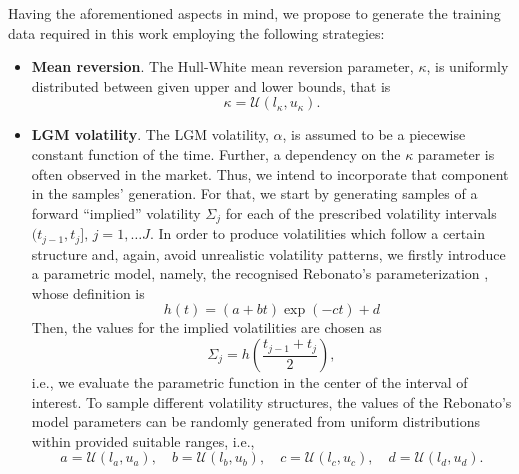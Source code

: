         Having the aforementioned aspects in mind, we propose to generate the training data required in this work employing the following strategies:
        \begin{itemize}
        
            \item \textbf{Mean reversion}. The Hull-White mean reversion parameter, $\kappa$, is uniformly distributed between given upper and lower bounds, that is
            \begin{equation*}
                \kappa = \mathcal{U}(l_{\kappa}, u_{\kappa}).
            \end{equation*}
        
            \item \textbf{LGM volatility}. The LGM volatility, $\alpha$, is assumed to be a piecewise constant function of the time. Further, a dependency on the $\kappa$ parameter is often observed in the market. Thus, we intend to incorporate that component in the samples' generation. For that, we start by generating samples of a forward ``implied'' volatility $\Sigma_j$ for each of the prescribed volatility intervals $(t_{j-1}, t_j], \, j=1,\dots J$. In order to produce volatilities which follow a certain structure and, again, avoid unrealistic volatility patterns, we firstly introduce a parametric model, namely, the recognised Rebonato's parameterization \cite{rebonato2009}, whose definition is
            \begin{equation*}
                h(t) = \left(a + bt\right)\exp\left(-ct\right) + d
            \end{equation*}
            Then, the values for the implied volatilities are chosen as
            \begin{equation*}
                \Sigma_j = h\left(\frac{t_{j-1} + t_j}{2}\right),
            \end{equation*}
            i.e., we evaluate the parametric function in the center of the interval of interest. To sample different volatility structures, the values of the Rebonato's model parameters can be randomly generated from uniform distributions within provided suitable ranges, i.e.,
            \begin{equation*}
                a = \mathcal{U}(l_a, u_a), \quad b = \mathcal{U}(l_b, u_b), \quad c = \mathcal{U}(l_c, u_c), \quad d = \mathcal{U}(l_d, u_d).
            \end{equation*}


\end{itemize}
